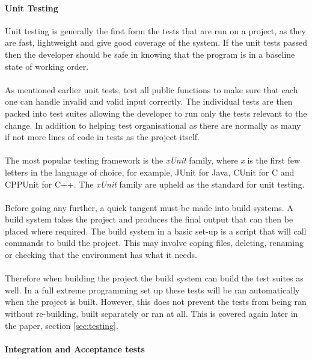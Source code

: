 \paragraph{Unit Testing}
Unit testing is generally the first form the tests that are run on a project, as they are fast, lightweight and give good coverage of the system. If the unit tests passed then the developer should be safe in knowing that the program is in a baseline state of working order. 
\\\\
As mentioned earlier unit tests, test all public functions to make sure that each one can handle invalid and valid input correctly. The individual tests are then packed into test suites allowing the developer to run only the tests relevant to the change. In addition to helping test organisational as there are normally as many if not more lines of code in tests as the project itself.
\\\\
The most popular testing framework is the \textit{xUnit} family, where \textit{x} is the first few letters in the language of choice, for example, JUnit for Java, CUnit for C and  CPPUnit for C++. The \textit{xUnit} family  are upheld as the standard for unit testing.
\\\\
Before going any further, a quick tangent must be made into build systems. A build system takes the project and produces the final output that can then be placed where required. The build system in a basic set-up is a script that will call commands to build the project. This may involve coping files, deleting, renaming or checking that the environment has what it needs.
\\\\
Therefore when building the project the build system can build the test suites as well. In a full extreme programming set up these tests will be ran automatically when the project is built. However, this does not prevent the tests from being ran without re-building, built separately or ran at all. This is covered again later in the paper, section \ref{sec:testing}.

\paragraph{Integration and Acceptance tests}

